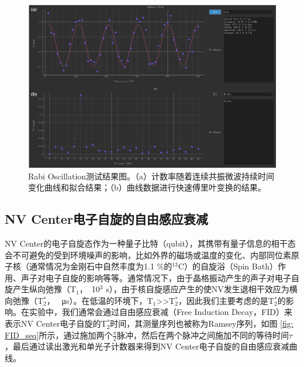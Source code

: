 \documentclass[type = bachelor]{whu-thesis}
\begin{document}
\begin{figure}
  \centering
  \includegraphics[width=1.0\textwidth]{figures/Chapter 1/Rabi Result.png}
  \caption[Rabi Oscillation测试结果图]{Rabi Oscillation测试结果图。（a）计数率随着连续共振微波持续时间变化曲线和拟合结果；（b）曲线数据进行快速傅里叶变换的结果。}
  \label{fig: Rabi Result}
\end{figure}

\subsection{NV Center电子自旋的自由感应衰减}

NV Center的电子自旋态作为一种量子比特（qubit），其携带有量子信息的相干态会不可避免的受到环境噪声的影响，比如外界的磁场或温度的变化、内部同位素原子核（通常情况为金刚石中自然丰度为1.1 \%的$^{13}$C）的自旋浴（Spin Bath）作用、声子对电子自旋的影响等等。通常情况下，由于晶格振动产生的声子对电子自旋产生纵向弛豫（T$_1$，~10$^3$ s），由于核自旋感应产生的使NV发生退相干效应为横向弛豫（T$_{2}^{*}$，~ μs）。在低温的环境下，T$_1$>>T$_{2}^{*}$，因此我们主要考虑的是T$_{2}^{*}$的影响。在实验中，我们通常会通过自由感应衰减（Free Induction Decay，FID）来表示NV Center电子自旋的T$_{2}^{*}$时间，其测量序列也被称为Ramsey序列，如图 \ref{fig: FID_seq}所示，通过施加两个$\frac{\pi}{2}$脉冲，然后在两个脉冲之间施加不同的等待时间$\tau$，最后通过读出激光和单光子计数器来得到NV Center电子自旋的自由感应衰减曲线。
\end{document}

